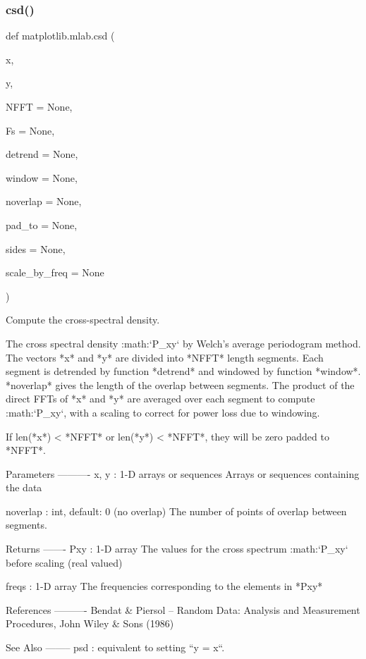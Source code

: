 \subsubsection{\texorpdfstring{csd()}{csd()}}
{\footnotesize\ttfamily def matplotlib.\+mlab.\+csd (\begin{DoxyParamCaption}\item[{}]{x,  }\item[{}]{y,  }\item[{}]{N\+F\+FT = {\ttfamily None},  }\item[{}]{Fs = {\ttfamily None},  }\item[{}]{detrend = {\ttfamily None},  }\item[{}]{window = {\ttfamily None},  }\item[{}]{noverlap = {\ttfamily None},  }\item[{}]{pad\+\_\+to = {\ttfamily None},  }\item[{}]{sides = {\ttfamily None},  }\item[{}]{scale\+\_\+by\+\_\+freq = {\ttfamily None} }\end{DoxyParamCaption})}

\begin{DoxyVerb}Compute the cross-spectral density.

The cross spectral density :math:`P_{xy}` by Welch's average
periodogram method.  The vectors *x* and *y* are divided into
*NFFT* length segments.  Each segment is detrended by function
*detrend* and windowed by function *window*.  *noverlap* gives
the length of the overlap between segments.  The product of
the direct FFTs of *x* and *y* are averaged over each segment
to compute :math:`P_{xy}`, with a scaling to correct for power
loss due to windowing.

If len(*x*) < *NFFT* or len(*y*) < *NFFT*, they will be zero
padded to *NFFT*.

Parameters
----------
x, y : 1-D arrays or sequences
    Arrays or sequences containing the data



noverlap : int, default: 0 (no overlap)
    The number of points of overlap between segments.

Returns
-------
Pxy : 1-D array
    The values for the cross spectrum :math:`P_{xy}` before scaling (real
    valued)

freqs : 1-D array
    The frequencies corresponding to the elements in *Pxy*

References
----------
Bendat & Piersol -- Random Data: Analysis and Measurement Procedures, John
Wiley & Sons (1986)

See Also
--------
psd : equivalent to setting ``y = x``.
\end{DoxyVerb}
 \mbox{\label{namespacematplotlib_1_1mlab_a6139bfa85c059f2a11858aaab4471a5d}} 
